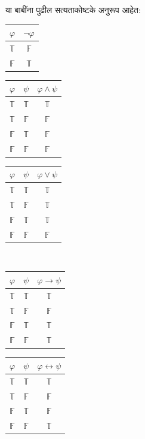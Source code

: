 \documentclass[11pt,a4paper,openany]{book}
\theoremstyle{definition}
\newenvironment{explain}{}{}
\newcommand{\lif}{\mathbin{\to}}
\newcommand{\liff}{\mathbin{\leftrightarrow}}
\newcommand{\True}{\ensuremath{\mathbb{T}}}
\newcommand{\False}{\ensuremath{\mathbb{F}}}
\begin{document}
\begin{explain}
या बाबींना पुढील सत्यताकोष्टके अनुरूप आहेत:
\begin{center}

  \begin{tabular}{|c||c|} \hline
    $\varphi$ & $ \lnot \varphi$ \\
    \hline \hline
    $\True$ & $\False$ \\
    $\False$ & $\True$ \\
    \hline
  \end{tabular}


  \begin{tabular}{|cc||c|} \hline
    $\varphi$ & $\psi$ & $\varphi \land \psi$ \\
    \hline \hline
    $\True$ & $\True$ & $\True$ \\
    $\True$ & $\False$ & $\False$ \\
    $\False$ & $\True$ & $\False$ \\
    $\False$ & $\False$ & $\False$ \\
    \hline
  \end{tabular}


  \begin{tabular}{|cc||c|} \hline
    $\varphi$ & $\psi$ & $\varphi \lor \psi$ \\
    \hline \hline
    $\True$ & $\True$ & $\True$ \\
    $\True$ & $\False$ & $\True$ \\
    $\False$ & $\True$ & $\True$ \\
    $\False$ & $\False$ & $\False$ \\
    \hline
  \end{tabular}
%
\\[1em]

  \begin{tabular}{|cc||c|} \hline
    $\varphi$ & $\psi$ & $\varphi \lif \psi$ \\
    \hline \hline
    $\True$ & $\True$ & $\True$ \\
    $\True$ & $\False$ & $\False$ \\
    $\False$ & $\True$ & $\True$ \\
    $\False$ & $\False$ & $\True$ \\
    \hline
  \end{tabular}


  \begin{tabular}{|cc||c|} \hline
    $\varphi$ & $\psi$ & $\varphi \liff \psi$ \\
    \hline \hline
    $\True$ & $\True$ & $\True$ \\
    $\True$ & $\False$ & $\False$ \\
    $\False$ & $\True$ & $\False$ \\
    $\False$ & $\False$ & $\True$ \\
    \hline
  \end{tabular}

\end{center}
\end{explain}
\end{document}
